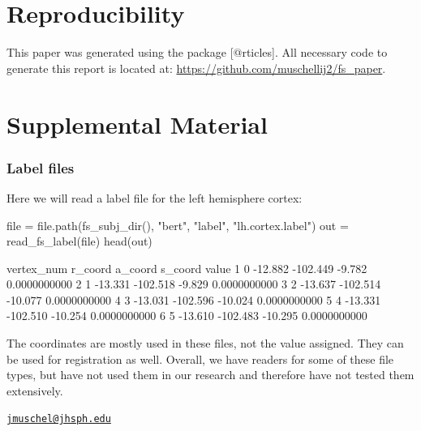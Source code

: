 \section{Reproducibility}\label{reproducibility}

This paper was generated using the  package
{[}@rticles{]}. All necessary code to generate this report is located
at: \url{https://github.com/muschellij2/fs_paper}.



\section{Supplemental Material}\label{supplemental-material}

\subsubsection{Label files}\label{label-files}

Here we will read a label file for the left hemisphere cortex:

\begin{Schunk}
\begin{Sinput}
file = file.path(fs_subj_dir(), "bert", "label", "lh.cortex.label")
out = read_fs_label(file)
head(out)
\end{Sinput}
\begin{Soutput}
  vertex_num r_coord  a_coord s_coord        value
1          0 -12.882 -102.449  -9.782 0.0000000000
2          1 -13.331 -102.518  -9.829 0.0000000000
3          2 -13.637 -102.514 -10.077 0.0000000000
4          3 -13.031 -102.596 -10.024 0.0000000000
5          4 -13.331 -102.510 -10.254 0.0000000000
6          5 -13.610 -102.483 -10.295 0.0000000000
\end{Soutput}
\end{Schunk}

The coordinates are mostly used in these files, not the value assigned.
They can be used for registration as well. Overall, we have readers for
some of these file types, but have not used them in our research and
therefore have not tested them extensively.

\address{%
John Muschelli\\
Johns Hopkins Bloomberg School of Public Health\\
Department of Biostatistics\\ 615 N Wolfe St, Baltimore, MD, 21205\\
}
\href{mailto:jmuschel@jhsph.edu}{\nolinkurl{jmuschel@jhsph.edu}}

